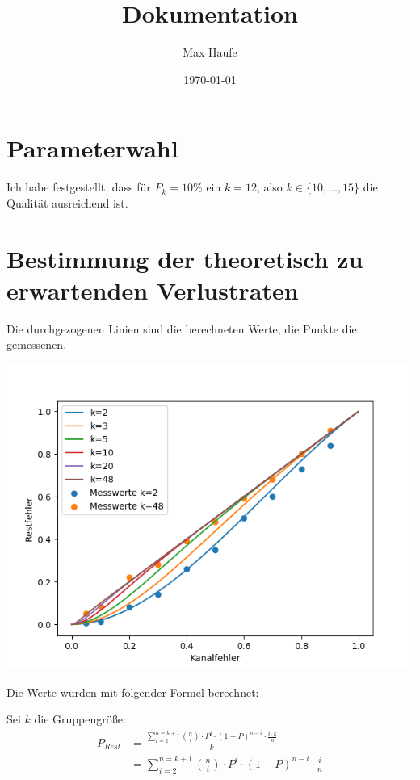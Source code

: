 \documentclass[11pt]{article}
\title{Dokumentation}
\author{Max Haufe}
\date{\today}
\begin{document}
    \maketitle


    \section{Parameterwahl}

    Ich habe festgestellt, dass für \(P_k = 10\%\) ein \(k = 12\), also \(k \in \{10,\dots,15\}\) die Qualität ausreichend ist.


    \section{Bestimmung der theoretisch zu erwartenden Verlustraten}

    Die durchgezogenen Linien sind die berechneten Werte, die Punkte die gemessenen.
    \begin{center}
        \includegraphics[scale=0.7]{plots}
    \end{center}

    \noindent
    Die Werte wurden mit folgender Formel berechnet:

    Sei \(k\) die Gruppengröße:
    \begin{equation}
        \begin{aligned}
            P_{Rest}
            & = \frac{ \sum_{i=2}^{n =k+1} \binom{n}{i} \cdot P^i \cdot (1-P)^{n-i} \cdot \frac{i \cdot k}{n}}
            {k} \\
            & = \sum_{i=2}^{n =k+1} \binom{n}{i} \cdot P^i \cdot (1-P)^{n-i} \cdot \frac{i}{n}\\
        \end{aligned}
    \end{equation}
\end{document}
